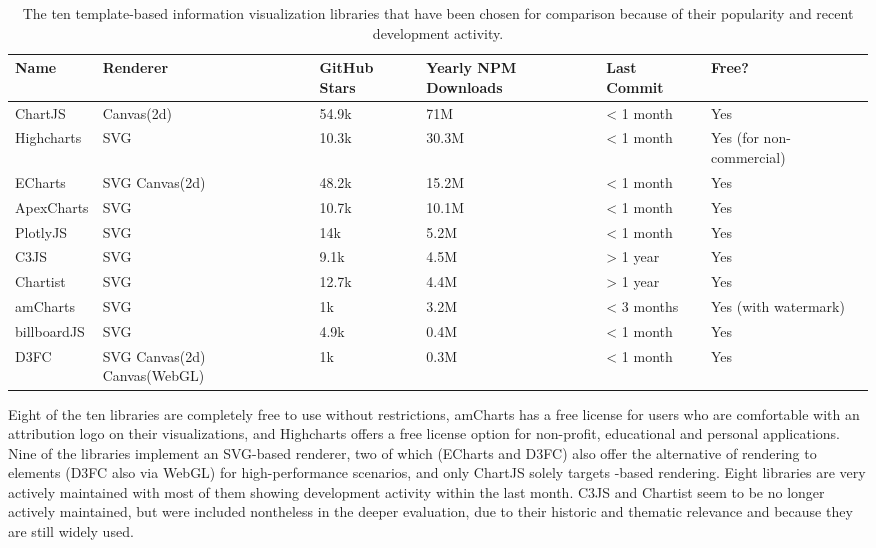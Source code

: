 \begin{table}[tp]
\tablestretch
{}
\centering
\begin{small}
\begin{tabularx}{\linewidth}{Xm{2.3cm}lm{1.8cm}lm{4cm}}
\toprule
Name & Renderer & GitHub Stars & Yearly NPM \newline Downloads & Last Commit & Free? \\
\midrule
ChartJS & Canvas(2d) & 54.9k & 71M & < 1 month & Yes \\
Highcharts & SVG & 10.3k & 30.3M & < 1 month & Yes (for non-commercial) \\
ECharts & SVG \newline Canvas(2d) & 48.2k & 15.2M & < 1 month & Yes \\
ApexCharts & SVG & 10.7k & 10.1M & < 1 month & Yes \\
PlotlyJS & SVG & 14k & 5.2M & < 1 month & Yes \\
C3JS & SVG & 9.1k & 4.5M & > 1 year & Yes \\
Chartist & SVG & 12.7k & 4.4M & > 1 year & Yes \\
amCharts & SVG & 1k & 3.2M & < 3 months & Yes (with watermark) \\
billboardJS & SVG & 4.9k & 0.4M & < 1 month & Yes \\
D3FC & SVG \newline Canvas(2d) \newline Canvas(WebGL) & 1k & 0.3M & < 1 month & Yes \\
\bottomrule
\end{tabularx}
\end{small}
\caption[Compared Template-Based Information Visualization Libraries]{
  The ten template-based information visualization libraries that have
  been chosen for comparison because of their popularity and recent
  development activity. }
\label{tab:ComparedTemplateBasedLibraries}
\end{table}


Eight of the ten libraries are completely free to use without
restrictions, amCharts has a free license for users who are
comfortable with an attribution logo on their visualizations, and
Highcharts offers a free license option for non-profit, educational
and personal applications. Nine of the libraries implement an
SVG-based renderer, two of which (ECharts and D3FC) also offer the
alternative of rendering to  elements (D3FC also via
WebGL) for high-performance scenarios, and only ChartJS solely targets
-based rendering. Eight libraries are very actively
maintained with most of them showing development activity within the
last month. C3JS and Chartist seem to be no longer actively
maintained, but were included nontheless in the deeper evaluation, due
to their historic and thematic relevance and because they are still
widely used.

